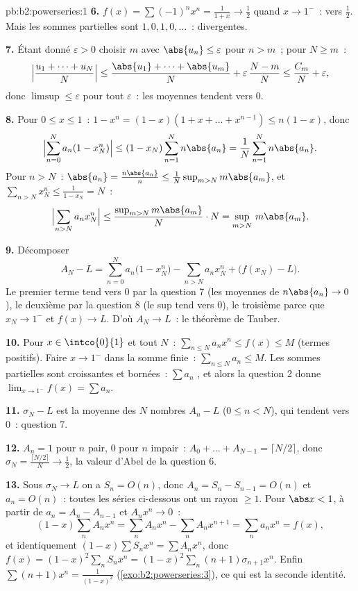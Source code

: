 \begin{solution}{pb:b2:powerseries:1}
\textbf{6.} $f(x) = \sum(-1)^nx^n = \frac{1}{1+x} \to \frac12$
quand $x \to 1^-$~:  vers $\frac12$. Mais les sommes
partielles sont $1, 0, 1, 0, \dots$~: divergentes.

\textbf{7.} Étant donné $\varepsilon > 0$ choisir $m$ avec $\abs{u_n}
\leq \varepsilon$ pour $n > m$~; pour $N \geq m$~:
\[
\Bigl|\frac{u_1 + \dots + u_N}{N}\Bigr|
\leq \frac{\abs{u_1} + \dots + \abs{u_m}}{N} +
\varepsilon\,\frac{N - m}{N}
\leq \frac{C_m}{N} + \varepsilon,
\]
donc $\limsup \leq \varepsilon$ pour tout $\varepsilon$~: les
moyennes tendent vers $0$.

\textbf{8.} Pour $0 \leq x \leq 1$~: $1 - x^n = (1-x)(1 + x +
\dots + x^{n-1}) \leq n(1-x)$, donc
\[
\Bigl|\sum_{n=0}^N a_n(1 - x_N^n)\Bigr|
\leq (1 - x_N)\sum_{n=1}^N n\abs{a_n}
= \frac1N\sum_{n=1}^{N}n\abs{a_n} .
\]
Pour $n > N$~: $\abs{a_n} = \frac{n\abs{a_n}}{n} \leq
\frac{1}{N}\sup_{m>N}m\abs{a_m}$, et $\sum_{n>N}x_N^n \leq
\frac{1}{1 - x_N} = N$~:
\[
\Bigl|\sum_{n>N}a_nx_N^n\Bigr|
\leq \frac{\sup_{m>N}m\abs{a_m}}{N}\cdot N
= \sup_{m>N}\,m\abs{a_m} .
\]

\textbf{9.} Décomposer
\[
A_N - L = \sum_{n=0}^{N}a_n\bigl(1 - x_N^n\bigr)
- \sum_{n>N}a_nx_N^n + \bigl(f(x_N) - L\bigr) .
\]
Le premier terme tend vers $0$ par la question 7 (les moyennes de
$n\abs{a_n} \to 0$), le deuxième par la question 8 (le sup tend vers
$0$), le troisième parce que $x_N \to 1^-$ et $f(x) \to L$. D'où
$A_N \to L$~: le théorème de Tauber.

\textbf{10.} Pour $x \in \intco{0}{1}$ et tout $N$~:
$\sum_{n\leq N}a_nx^n \leq f(x) \leq M$ (termes positifs).
Faire $x \to 1^-$ dans la somme finie~: $\sum_{n\leq N}a_n \leq M$.
Les sommes partielles sont croissantes et bornées~: $\sum a_n$
, et alors la question 2 donne $\lim_{x\to1^-}f(x) =
\sum a_n$.

\textbf{11.} $\sigma_N - L$ est la moyenne des $N$ nombres
$A_n - L$ ($0 \leq n < N$), qui tendent vers $0$~: question 7.

\textbf{12.} $A_n = 1$ pour $n$ pair, $0$ pour $n$ impair~: $A_0 + \dots
+ A_{N-1} = \lceil N/2\rceil$, donc $\sigma_N =
\frac{\lceil N/2\rceil}{N} \to \frac12$, la valeur d'Abel de
la question 6.

\textbf{13.} Sous $\sigma_N \to L$ on a $S_n = O(n)$, donc
$A_n = S_n - S_{n-1} = O(n)$ et $a_n = O(n)$~: toutes les séries
ci-dessous ont un rayon $\geq 1$. Pour $\abs x < 1$, à partir de $a_n = A_n -
A_{n-1}$ et $A_nx^n \to 0$~:
\[
(1-x)\sum_n A_nx^n = \sum_n A_nx^n - \sum_n A_nx^{n+1}
= \sum_n a_nx^n = f(x),
\]
et identiquement $(1-x)\sum S_nx^n = \sum A_nx^n$, donc $f(x) =
(1-x)^2\sum_n S_nx^n = (1-x)^2\sum_n(n+1)\sigma_{n+1}x^n$.
Enfin $\sum(n+1)x^n = \frac{1}{(1-x)^2}$
(\cref{exo:b2:powerseries:3}), ce qui est la seconde identité.


\end{solution}
